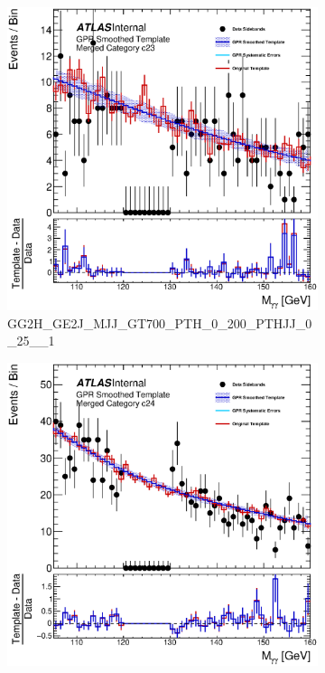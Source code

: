 \begin{figure}
\begin{center}
\begin{subfigure}[T]{0.49\linewidth}
	\includegraphics[width=\linewidth]{figures/background/gpr/coupCatTemplates/GPR_Smoothed_Plot_hmgg_c23.eps}
	\caption{\tiny{GG2H\_GE2J\_MJJ\_GT700\_PTH\_0\_200\_PTHJJ\_0\_25\_\_1}}
\end{subfigure}
\begin{subfigure}[T]{0.49\linewidth}
	\centering
	\includegraphics[width=\linewidth]{figures/background/gpr/coupCatTemplates/GPR_Smoothed_Plot_hmgg_c24.eps}

\end{subfigure}
\end{center}
\end{figure}

